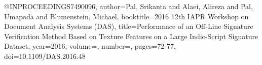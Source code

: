 @INPROCEEDINGS{7490096,
  author={Pal, Srikanta and Alaei, Alireza and Pal, Umapada and Blumenstein, Michael},
  booktitle={2016 12th IAPR Workshop on Document Analysis Systems (DAS)}, 
  title={Performance of an Off-Line Signature Verification Method Based on Texture Features on a Large Indic-Script Signature Dataset}, 
  year={2016},
  volume={},
  number={},
  pages={72-77},
  doi={10.1109/DAS.2016.48}}
